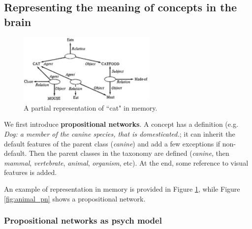 \subsection{Representing the meaning of concepts in the brain}

\begin{figure}
  \centering
  \includegraphics[width=0.6\textwidth]{images/cat_pn.png}
  \caption{A partial representation of ``cat" in memory.}
  \label{fig:cat_pn}
\end{figure}

We first introduce \textbf{propositional networks}.
A concept has a definition (e.g. \textit{Dog: a member of the canine species, that is domesticated.}; it can inherit the default features of the parent class (\textit{canine}) and add a few exceptions if non-default. 
Then the parent classes in the taxonomy are defined (\textit{canine}, then \textit{mammal}, \textit{vertebrate}, \textit{animal}, \textit{organism}, etc).
At the end, some reference to visual features is added.

An example of representation in memory is provided in Figure \ref{fig:cat_pn}, while Figure \ref{fig:animal_pn} shows a propositional network.

\subsubsection{Propositional networks as psych model}

